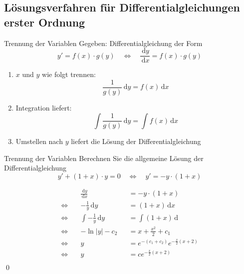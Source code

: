 \documentclass[german]{../spicker}
\renewcommand{\d}{\,\mathrm{d}}
\renewcommand{\abs}[1]{\left| #1 \right|}
\begin{document}
\subsection{Lösungsverfahren für Differentialgleichungen erster Ordnung}

\begin{algo}{Trennung der Variablen}
    Gegeben: Differentialgleichung der Form
    $$
        \boxed{y' = f(x) \cdot g(y)} \quad \iff \quad \frac{\d y}{\d x} = f(x) \cdot g(y)
    $$
    \begin{enumerate}
        \item $x$ und $y$ wie folgt trennen:
              $$
                  \frac{1}{g(y)} \d y = f(x) \d x
              $$
        \item Integration liefert:
              $$
                  \int \frac{1}{g(y)} \d y = \int f(x) \d x
              $$
        \item Umstellen nach $y$ liefert die Lösung der Differentialgleichung
    \end{enumerate}
\end{algo}

\begin{example}{Trennung der Variablen}
    Berechnen Sie die allgemeine Lösung der Differentialgleichung
    $$
        y' + (1+x)\cdot y = 0\quad \iff \quad y' = -y\cdot (1+x)
    $$
    \noindent\makebox[\linewidth]{\rule{\textwidth}{1pt}}

    $$
        \begin{aligned}
                       & \frac{\d y}{\d x}      &  & = -y \cdot (1+x)                        \\
            \iff \quad & -\frac{1}{y} \d y      &  & = (1+x) \d x                            \\
            \iff \quad & \int -\frac{1}{y} \d y &  & = \int (1+x) \d                         \\
            \iff \quad & - \ln\abs{y} - c_2     &  & = x + \frac{x^2}{2} + c_1               \\
            \iff \quad & y                      &  & = e^{-(c_1 + c_2)}e^{-\frac{x}{2}(x+2)} \\
            \iff \quad & y                      &  & = ce^{-\frac{x}{2}(x+2)}                \\
        \end{aligned}
    $$\qed
\end{example}
\end{document}
